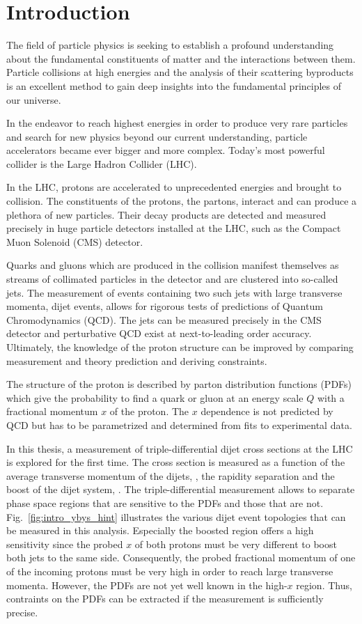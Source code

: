 
\chapter{Introduction}

The field of particle physics is seeking to establish a profound understanding
about the fundamental constituents of matter and the interactions
between them. Particle collisions at high energies and the analysis of
their scattering byproducts is an excellent method to gain deep insights into
the fundamental principles of our universe.

In the endeavor to reach highest energies in order to produce very rare
particles and search for new physics beyond our current understanding, particle accelerators became ever bigger
and more complex. Today's most powerful collider is the Large Hadron Collider
(LHC).

In the LHC, protons are accelerated to unprecedented energies and brought to
collision. The constituents of the protons, the partons, interact and can
produce a plethora of new particles. Their decay products are detected and
measured precisely in huge particle detectors installed at the LHC, such as the
Compact Muon Solenoid (CMS) detector.

Quarks and gluons which are produced in the collision manifest themselves as
streams of collimated particles in the detector and are clustered into so-called
jets. The measurement of events containing two such jets with large
transverse momenta, dijet events, allows for rigorous tests of predictions of
Quantum Chromodynamics (QCD). The jets can be measured precisely in the CMS
detector and perturbative QCD exist at next-to-leading order accuracy.
Ultimately, the knowledge of the proton structure can be improved by comparing
measurement and theory prediction and deriving constraints.

The structure of the proton is described by parton distribution functions (PDFs) which
give the probability to find a quark or gluon at an energy scale $Q$ with a fractional
momentum $x$ of the proton. The $x$ dependence is not predicted by QCD but has
to be parametrized and determined from fits to experimental data.

In this thesis, a measurement of triple-differential dijet cross sections at the
LHC is explored for the first time. The cross section is measured as a function
of the average transverse momentum of the dijets, \ptavg, the rapidity
separation \ystar and the boost of the dijet system, \yboost. The
triple-differential measurement allows to separate phase space regions that are
sensitive to the PDFs and those that are not.  Fig.~\ref{fig:intro_ybys_hint}
illustrates the various dijet event topologies that can be measured in this
analysis. Especially the boosted region offers a high sensitivity since the
probed $x$ of both protons must be very different to boost both jets to the same
side. Consequently, the probed fractional momentum of one of the incoming
protons must be very high in order to reach large transverse momenta. However,
the PDFs are not yet well known in the high-$x$ region. Thus, contraints on the
PDFs can be extracted if the measurement is sufficiently precise.

